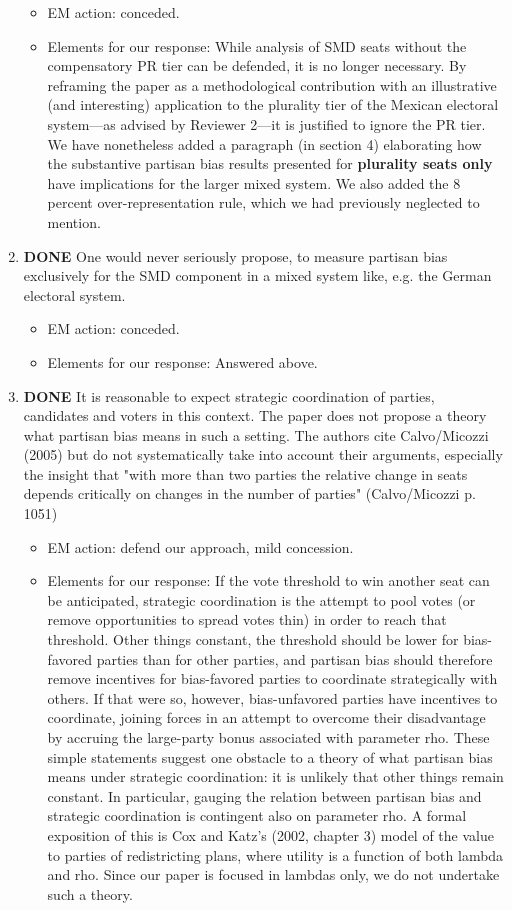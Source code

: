 \documentclass{article}
\begin{document}
\begin{enumerate}
\label{sec:orgheadline22}
\begin{itemize}
\item EM action: conceded.
\item Elements for our response: While analysis of SMD seats without the compensatory PR tier can be defended, it is no longer necessary. By reframing the paper as a methodological contribution with an illustrative (and interesting) application to the plurality tier of the Mexican electoral system---as advised by Reviewer 2---it is justified to ignore the PR tier. We have nonetheless added a paragraph (in section 4) elaborating how the substantive partisan bias results presented for \textbf{plurality seats only} have implications for the larger mixed system. We also added the 8 percent over-representation rule, which we had previously neglected to mention.
\end{itemize}
\item {\bfseries\sffamily DONE} One would never seriously propose, to measure partisan bias exclusively for the SMD component in a mixed system like, e.g. the German electoral system.
\label{sec:orgheadline23}
\begin{itemize}
\item EM action: conceded.
\item Elements for our response: Answered above.
\end{itemize}
\item {\bfseries\sffamily DONE} It is reasonable to expect strategic coordination of parties, candidates and voters in this context. The paper does not propose a theory what partisan bias means in such a setting. The authors cite Calvo/Micozzi (2005) but do not systematically take into account their arguments, especially the insight that "with more than two parties the relative change in seats depends critically on changes in the number of parties" (Calvo/Micozzi p. 1051)
\label{sec:orgheadline24}
\begin{itemize}
\item EM action: defend our approach, mild concession.
\item Elements for our response: If the vote threshold to win another seat can be anticipated, strategic coordination is the attempt to pool votes (or remove opportunities to spread votes thin) in order to reach that threshold. Other things constant, the threshold should be lower for bias-favored parties than for other parties, and partisan bias should therefore remove incentives for bias-favored parties to coordinate strategically with others. If that were so, however, bias-unfavored parties have incentives to coordinate, joining forces in an attempt to overcome their disadvantage by accruing the large-party bonus associated with parameter rho. These simple statements suggest one obstacle to a theory of what partisan bias means under strategic coordination: it is unlikely that other things remain constant. In particular, gauging the relation between partisan bias and strategic coordination is contingent also on parameter rho. A formal exposition of this is Cox and Katz's (2002, chapter 3) model of the value to parties of redistricting plans, where utility is a function of both lambda and rho. Since our paper is focused in lambdas only, we do not undertake such a theory.

\end{itemize}
\end{enumerate}
\end{document}
